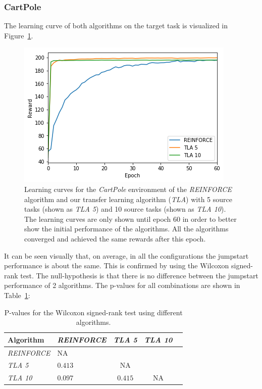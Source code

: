 \subsubsection{CartPole} %
\label{ssub:without_sparse_representation_transfer:cartpole}
The learning curve of both algorithms on the target task is visualized in Figure~\ref{fig:CartPole:reward_target_re-akt5-akt10}.
\begin{figure}[H]
    \centering
    \includegraphics[width=.8\linewidth]{images/results/CartPole/no_sparse_transfer/reward_target_re-akt5-akt10.png}
    \caption[Learning curves for \textit{REINFORCE} and \textit{TLA} for the \emph{CartPole} environment]{Learning curves for the \textit{CartPole} environment of the \textit{REINFORCE} algorithm and our transfer learning algorithm (\textit{TLA}) with 5 source tasks (shown as \textit{TLA 5}) and 10 source tasks (shown as \textit{TLA 10}). The learning curves are only shown until epoch 60 in order to better show the initial performance of the algorithms. All the algorithms converged and achieved the same rewards after this epoch.}
    \label{fig:CartPole:reward_target_re-akt5-akt10}
\end{figure}
It can be seen visually that, on average, in all the configurations the jumpstart performance is about the same. This is confirmed by using the Wilcoxon signed-rank test. The null-hypothesis is that there is no difference between the jumpstart performance of 2 algorithms.
The p-values for all combinations are shown in Table~\ref{tab:nosparse:pvalues}:
\begin{table}[htb]
    \centering
    \begin{tabular}{llccc}
    \hline
    Algorithm & \textit{REINFORCE} & \textit{TLA 5} & \textit{TLA 10} \\
    \hline
       \textit{REINFORCE}  & NA & & \\
       \textit{TLA 5} & $0.413$ & NA & \\
       \textit{TLA 10} & $0.097$ & $0.415$ & NA \\
    \hline
    \end{tabular}
    \caption{P-values for the Wilcoxon signed-rank test using different algorithms.}
    \label{tab:nosparse:pvalues}
\end{table}

